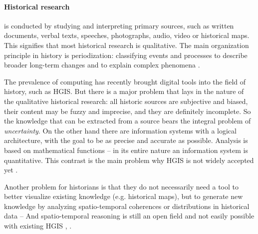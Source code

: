 \paragraph{Historical research} %
\label{par:historical_research}
is conducted by studying and interpreting primary sources, such as written documents, verbal texts, speeches, photographs, audio, video or historical maps. This signifies that most historical research is qualitative. The main organization principle in history is periodization: classifying events and processes to describe broader long-term changes and to explain complex phenomena
\cite[pp.4-7]{knowles2008placing}.




The prevalence of computing has recently brought digital tools into the field of history, such as HGIS. But there is a major problem that lays in the nature of the qualitative historical research: all historic sources are subjective and biased, their content may be fuzzy and imprecise, and they are definitely incomplete. So the knowledge that can be extracted from a source bears the integral problem of \emph{uncertainty}. On the other hand there are information systems with a logical architecture, with the goal to be as precise and accurate as possible. Analysis is based on mathematical functions -- in its entire nature an information system is quantitative. This contrast is the main problem why HGIS is not widely accepted yet
\cite[p. 2]{knowles2008placing}.

Another problem for historians is that they do not necessarily need a tool to better visualize existing knowledge (e.g. historical maps), but to generate new knowledge by analyzing spatio-temporal coherences or distributions in historical data -- And spatio-temporal reasoning is still an open field and not easily possible with existing HGIS
\cite[p. 268]{knowles2008placing}, \cite[p. xii]{gregory2014toward}.

